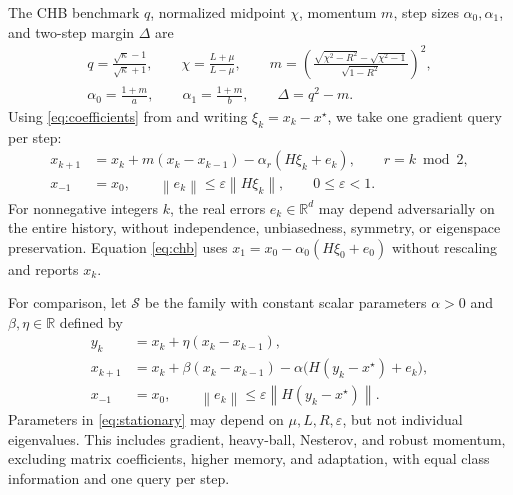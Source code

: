 \documentclass[pdflatex,sn-mathphys-num]{sn-jnl}
\theoremstyle{thmstyleone}
\theoremstyle{thmstyletwo}
\newcommand{\R}{\mathbb R}
\newcommand{\norm}[1]{\left\lVert #1\right\rVert}
\begin{document}
The CHB benchmark $q$, normalized midpoint $\chi$, momentum $m$,
step sizes $\alpha_0,\alpha_1$, and two-step margin $\Delta$ are
\begin{equation}\label{eq:coefficients}
\begin{gathered}
 q=\frac{\sqrt\kappa-1}{\sqrt\kappa+1},\qquad
 \chi=\frac{L+\mu}{L-\mu},\qquad
 m=\left(\frac{\sqrt{\chi^2-R^2}-\sqrt{\chi^2-1}}
                  {\sqrt{1-R^2}}\right)^2,\\
 \alpha_0=\frac{1+m}{a},\qquad
 \alpha_1=\frac{1+m}{b},\qquad
 \Delta=q^2-m .
\end{gathered}
\end{equation}
Using \eqref{eq:coefficients} from \cite[Algorithm 2]{goujaud2022}
and writing $\xi_k=x_k-x^\star$, we take one gradient query per step:
\begin{equation}\label{eq:chb}
\begin{split}
 x_{k+1}&=x_k+m(x_k-x_{k-1})-\alpha_r(H\xi_k+e_k),
 \qquad r=k\bmod 2,\\
 x_{-1}&=x_0,\qquad
 \norm{e_k}\leq\varepsilon\norm{H\xi_k},\qquad 0\leq\varepsilon<1 .
\end{split}
\end{equation}
For nonnegative integers $k$, the real errors $e_k\in\R^d$ may depend
adversarially on the entire history, without independence, unbiasedness,
symmetry, or eigenspace preservation. Equation \eqref{eq:chb} uses
$x_1=x_0-\alpha_0(H\xi_0+e_0)$ without rescaling and reports $x_k$.

For comparison, let $\mathcal S$ be the family with constant scalar
parameters $\alpha>0$ and $\beta,\eta\in\R$ defined by
\begin{equation}\label{eq:stationary}
\begin{split}
 y_k&=x_k+\eta(x_k-x_{k-1}),\\
 x_{k+1}&=x_k+\beta(x_k-x_{k-1})
       -\alpha\bigl(H(y_k-x^\star)+e_k\bigr),\\
 x_{-1}&=x_0,\qquad
 \norm{e_k}\leq\varepsilon\norm{H(y_k-x^\star)} .
\end{split}
\end{equation}
Parameters in \eqref{eq:stationary} may depend on $\mu,L,R,\varepsilon$,
but not individual eigenvalues. This includes gradient, heavy-ball,
Nesterov, and robust momentum, excluding matrix coefficients, higher
memory, and adaptation, with equal class information and one query per step.
\end{document}

